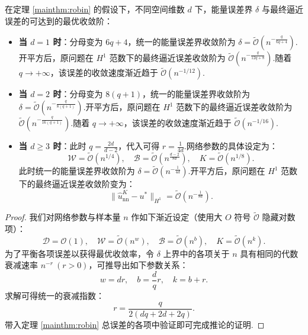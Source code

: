 \begin{corollary}\label{cor:corrobin}
在定理 \ref{mainthm:robin} 的假设下，不同空间维数 $d$ 下，能量误差界 $\delta$ 与最终逼近误差的可达到的最优收敛阶：

\begin{itemize}
    \item \textbf{当 $d = 1$ 时}：分母变为 $6q+4$，统一的能量误差界收敛阶为 $\delta = \widetilde{\mathcal{O}}\left( n^{-\frac{q}{6q+4}} \right)$.开平方后，原问题在 $H^1$ 范数下的最终逼近误差收敛阶为 $\widetilde{\mathcal{O}}\left( n^{-\frac{q}{12q+8}} \right)$.随着 $q \to +\infty$，该误差的收敛速度渐近趋于 $\widetilde{\mathcal{O}}\left( n^{-1/12} \right)$.
    
    \item \textbf{当 $d = 2$ 时}：分母变为 $8(q+1)$，统一的能量误差界收敛阶为 $\delta = \widetilde{\mathcal{O}}\left( n^{-\frac{q}{8(q+1)}} \right)$.开平方后，原问题在 $H^1$ 范数下的最终逼近误差收敛阶为 $\widetilde{\mathcal{O}}\left( n^{-\frac{q}{16(q+1)}} \right)$.随着 $q \to +\infty$，该误差的收敛速度渐近趋于 $\widetilde{\mathcal{O}}\left( n^{-1/16} \right)$.
    
    \item \textbf{当 $d \geq 3$ 时}：此时 $q = \frac{2d}{d-2}$，代入可得 $r = \frac{1}{4d}$.网络参数的具体设定为：
    $$ \mathcal{W} = \widetilde{\mathcal{O}}\left(n^{1/4}\right), \quad \mathcal{B} = \widetilde{\mathcal{O}}\left(n^{\frac{d-2}{8d}}\right), \quad K = \widetilde{\mathcal{O}}\left(n^{1/8}\right). $$
    此时统一的能量误差界收敛阶为 $\delta = \widetilde{\mathcal{O}}\left( n^{-\frac{1}{4d}} \right)$.开平方后，原问题在 $H^1$ 范数下的最终逼近误差收敛阶变为：
    $$ \|\widehat{u}_{\text{nn}}^K-u^*\|_{H^{1}} = \widetilde{\mathcal{O}}\left( n^{-\frac{1}{8d}} \right). $$
\end{itemize}
\end{corollary}
\begin{proof}
我们对网络参数与样本量 $n$ 作如下渐近设定（使用大 $O$ 符号 $\widetilde{\mathcal{O}}$ 隐藏对数项）：
$$ \mathcal{D} = \mathcal{O}(1), \quad \mathcal{W} = \widetilde{\mathcal{O}}(n^w), \quad \mathcal{B} = \widetilde{\mathcal{O}}(n^b), \quad K = \widetilde{\mathcal{O}}(n^k). $$
为了平衡各项误差以获得最优收敛率，令 $\delta$ 上界中的各项关于 $n$ 具有相同的代数衰减速率 $n^{-r} \ (r>0)$，可推导出如下参数关系：
$$ w = dr, \quad b = \frac{d}{q}r, \quad k = b+r. $$
求解可得统一的衰减指数：
\begin{equation*}
r = \frac{q}{2(dq + 2d + 2q)}.
\end{equation*}
带入定理 \ref{mainthm:robin} 总误差的各项中验证即可完成推论的证明.
\end{proof}

